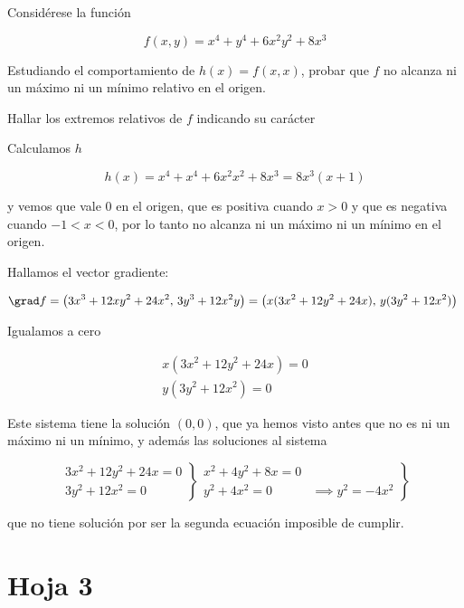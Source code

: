 \begin{problem}[14] Considérese la función 

\[ f(x,y) = x^4 + y^4 + 6x^2y^2 + 8 x^3 \]

\ppart Estudiando el comportamiento de $h(x)=f(x,x)$, probar que $f$ no alcanza ni un máximo ni un mínimo relativo en el origen. 

\ppart Hallar los extremos relativos de $f$ indicando su carácter

\solution

\spart Calculamos $h$

\[ h(x) = x^4 + x^4 + 6x^2x^2 + 8 x^3 = 8x^3(x + 1) \]

y vemos que vale $0$ en el origen, que es positiva cuando $x>0$ y que es negativa cuando $-1<x<0$, por lo tanto no alcanza ni un máximo ni un mínimo en el origen.

\spart Hallamos el vector gradiente:

\[ \grad f = \left(3x^3 + 12xy^2 + 24x^2,\, 3y^3 + 12x^2y\right) = \left(x(3x^2 + 12y^2 + 24x),\, y(3y^2+12x^2)\right) \]

Igualamos a cero

\[ \left.\begin{matrix}
x(3x^2 + 12y^2 + 24x) = 0 \\
y(3y^2+12x^2) = 0  
\end{matrix}\right. \]

Este sistema tiene la solución $(0,0)$, que ya hemos visto antes que no es ni un máximo ni un mínimo, y además las soluciones al sistema 

\[ \left.\begin{matrix} 3x^2 + 12y^2 + 24x = 0 \\
3y^2 +12x^2 = 0
\end{matrix}\right\} 
\left.\begin{matrix} x^2 + 4y^2 + 8x = 0 &  \\
y^2 +4x^2 = 0 & \implies y^2 = -4x^2 
\end{matrix}\right\}  \]

que no tiene solución por ser la segunda ecuación imposible de cumplir.
\end{problem}

\section{Hoja 3}

